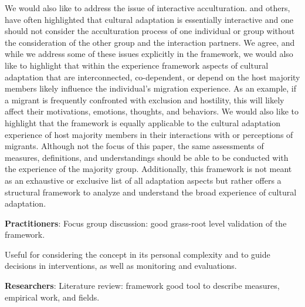\documentclass[man, 12pt, a4paper]{apa7}
\begin{document}
We would also like to address the issue of interactive acculturation. \citet{Bourhis1997a} and others, have often highlighted that cultural adaptation is essentially interactive and one should not consider the acculturation process of one individual or group without the consideration of the other group and the interaction partners. We agree, and while we address some of these issues explicitly in the framework, we would also like to highlight that within the experience framework aspects of cultural adaptation that are interconnected, co-dependent, or depend on the host majority members likely influence the individual's migration experience. As an example, if a migrant is frequently confronted with exclusion and hostility, this will likely affect their motivations, emotions, thoughts, and behaviors. 
We would also like to highlight that the framework is equally applicable to the cultural adaptation experience of host majority members in their interactions with or perceptions of migrants. Although not the focus of this paper, the same assessments of measures, definitions, and understandings should be able to be conducted with the experience of the majority group.
Additionally, this framework is not meant as an exhaustive or exclusive list of all adaptation aspects but rather offers a structural framework to analyze and understand the broad experience of cultural adaptation.


\vspace{1em}
\textbf{Practitioners}: Focus group discussion: good grass-root level validation of the framework.

Useful for considering the concept in its personal complexity and to guide decisions in interventions, as well as monitoring and evaluations. 

\textbf{Researchers}: Literature review: framework good tool to describe measures, empirical work, and fields.
\end{document}
